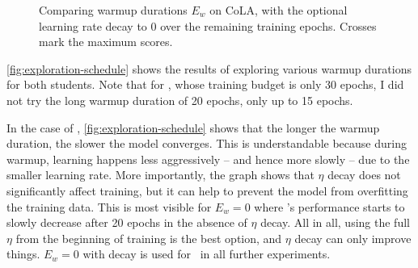 {{    \begin{figure}[h!t]
      \centering
      \caption{Comparing warmup durations $E_w$ on CoLA, with the optional learning rate decay to 0 over the remaining training epochs. Crosses mark the maximum scores. \sliding}
      \label{fig:exploration-schedule}
    \end{figure}

    \autoref{fig:exploration-schedule} shows the results of exploring various warmup durations for both students. Note that for \LSTMS, whose training budget is only 30 epochs, I did not try the long warmup duration of 20 epochs, only up to 15 epochs.

    In the case of \LSTMS, \autoref{fig:exploration-schedule} shows that the longer the warmup duration, the slower the model converges. This is understandable because during warmup, learning happens less aggressively -- and hence more slowly -- due to the smaller learning rate. More importantly, the graph shows that $\eta$ decay does not significantly affect training, but it can help to prevent the model from overfitting the training data. This is most visible for $E_w=0$ where \LSTMS's performance starts to slowly decrease after 20 epochs in the absence of $\eta$ decay. All in all, using the full $\eta$ from the beginning of training is the best option, and $\eta$ decay can only improve things. $E_w=0$ with decay is used for \LSTMS~in all further experiments.

}}
